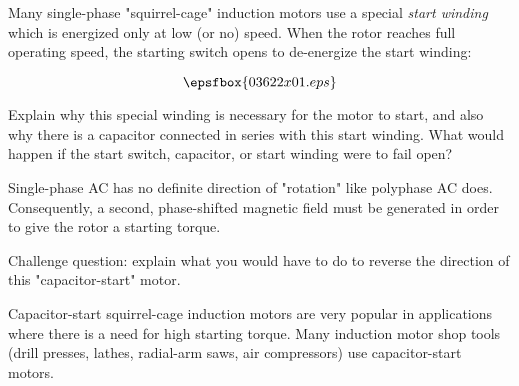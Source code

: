 

Many single-phase "squirrel-cage" induction motors use a special {\it start winding} which is energized only at low (or no) speed.  When the rotor reaches full operating speed, the starting switch opens to de-energize the start winding:

$$\epsfbox{03622x01.eps}$$

Explain why this special winding is necessary for the motor to start, and also why there is a capacitor connected in series with this start winding.  What would happen if the start switch, capacitor, or start winding were to fail open?







Single-phase AC has no definite direction of "rotation" like polyphase AC does.  Consequently, a second, phase-shifted magnetic field must be generated in order to give the rotor a starting torque.

\vskip 10pt

Challenge question: explain what you would have to do to reverse the direction of this "capacitor-start" motor.







Capacitor-start squirrel-cage induction motors are very popular in applications where there is a need for high starting torque.  Many induction motor shop tools (drill presses, lathes, radial-arm saws, air compressors) use capacitor-start motors.




